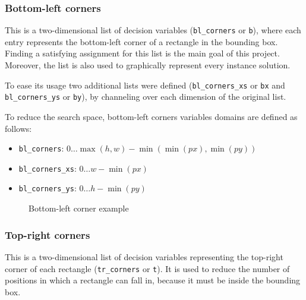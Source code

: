 \documentclass[a4paper,10pt]{article}
\begin{document}
\subsubsection*{Bottom-left corners} \label{sec:bottom-left-corners}
This is a two-dimensional list of decision variables (\texttt{bl\_corners} or \texttt{b}), where each entry represents the bottom-left corner of a rectangle in the bounding box. Finding a satisfying assignment for this list is the main goal of this project. Moreover, the list is also used to graphically represent every instance solution.

To ease its usage two additional lists were defined (\texttt{bl\_corners\_xs} or \texttt{bx} and \texttt{bl\_corners\_ys} or \texttt{by}), by channeling over each dimension of the original list.

To reduce the search space, bottom-left corners variables domains are defined as follows:
\begin{itemize}
   \item \texttt{bl\_corners}: $0 \dots \max({h, w}) - \min({\min({px}), \min({py})})$
   \item \texttt{bl\_corners\_xs}: $0 \dots w - \min({px})$
   \item \texttt{bl\_corners\_ys}: $0 \dots h - \min({py})$
\end{itemize}

\begin{figure}[H]
   \centering
   \caption{Bottom-left corner example}
\end{figure}

\subsubsection*{Top-right corners} \label{sec:top-right-corners}
This is a two-dimensional list of decision variables representing the top-right corner of each rectangle (\texttt{tr\_corners} or \texttt{t}). It is used to reduce the number of positions in which a rectangle can fall in, because it must be inside the bounding box.
\end{document}
